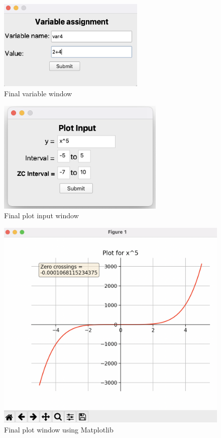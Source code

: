 \documentclass[a4paper, oneside, 11pt]{report}
\begin{document}
\begin{figure}[H]
    \centering
    \includegraphics[width=7cm]{final_var.jpg}
    \caption{Final variable window}
    \label{fig:final_variable}
\end{figure}

\begin{figure}[H]
    \centering
    \includegraphics[width=8cm]{final_plotwin.jpg}
    \caption{Final plot input window}
    \label{fig:final_plot_input}
\end{figure}

\begin{figure}[H]
    \centering
    \includegraphics[width=13cm]{final_plot.jpg}
    \caption{Final plot window using Matplotlib}
    \label{fig:final_plot}
\end{figure}
\end{document}
